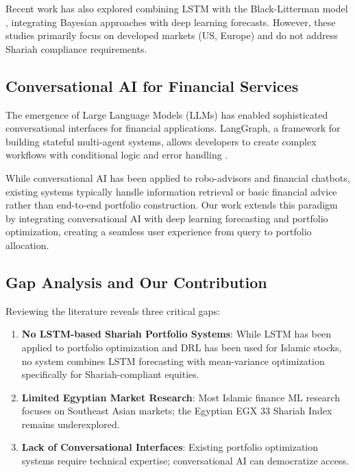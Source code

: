 \documentclass[conference]{IEEEtran}
\begin{document}
Recent work has also explored combining LSTM with the Black-Litterman model \cite{bl_lstm_2024}, integrating Bayesian approaches with deep learning forecasts. However, these studies primarily focus on developed markets (US, Europe) and do not address Shariah compliance requirements.

\subsection{Conversational AI for Financial Services}

The emergence of Large Language Models (LLMs) has enabled sophisticated conversational interfaces for financial applications. LangGraph, a framework for building stateful multi-agent systems, allows developers to create complex workflows with conditional logic and error handling \cite{langgraph_2024}.

While conversational AI has been applied to robo-advisors and financial chatbots, existing systems typically handle information retrieval or basic financial advice rather than end-to-end portfolio construction. Our work extends this paradigm by integrating conversational AI with deep learning forecasting and portfolio optimization, creating a seamless user experience from query to portfolio allocation.

\subsection{Gap Analysis and Our Contribution}

Reviewing the literature reveals three critical gaps:
\begin{enumerate}
\item \textbf{No LSTM-based Shariah Portfolio Systems}: While LSTM has been applied to portfolio optimization and DRL has been used for Islamic stocks, no system combines LSTM forecasting with mean-variance optimization specifically for Shariah-compliant equities.

\item \textbf{Limited Egyptian Market Research}: Most Islamic finance ML research focuses on Southeast Asian markets; the Egyptian EGX 33 Shariah Index remains underexplored.

\item \textbf{Lack of Conversational Interfaces}: Existing portfolio optimization systems require technical expertise; conversational AI can democratize access.
\end{enumerate}
\end{document}
